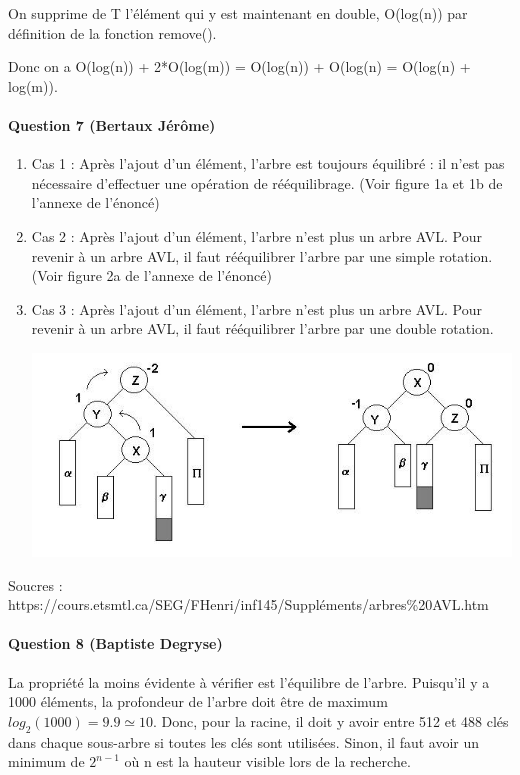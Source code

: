 \documentclass[a4paper]{article}
\begin{document}
On supprime de T l'élément qui y est maintenant en double, O(log(n)) par définition de la fonction remove().

Donc on a O(log(n)) + 2*O(log(m)) = O(log(n)) + O(log(n) = O(log(n) + log(m)). 

\paragraph*{Question 7 (Bertaux Jérôme)}
\begin{enumerate}
\item Cas 1 :  Après l'ajout d'un élément, l'arbre est toujours équilibré : il n'est pas nécessaire d'effectuer une opération de rééquilibrage. (Voir figure 1a et 1b de l'annexe de l'énoncé)
\item Cas 2 : Après l'ajout d'un élément, l'arbre n'est plus un arbre AVL. Pour revenir à un arbre AVL, il faut rééquilibrer l'arbre par une simple rotation. (Voir figure 2a de l'annexe de l'énoncé)
\item Cas 3 : Après l'ajout d'un élément, l'arbre n'est plus un arbre AVL. Pour revenir à un arbre AVL, il faut rééquilibrer l'arbre par une double rotation.
\begin{center}
\includegraphics[scale=0.5]{double_rotation}
\end{center}
\end{enumerate}
{\footnotesize Soucres : \\
https://cours.etsmtl.ca/SEG/FHenri/inf145/Suppléments/arbres\%20AVL.htm\\}

\paragraph*{Question 8 (Baptiste Degryse)}
La propriété la moins évidente à vérifier est l'équilibre de l'arbre. Puisqu'il y a 1000 éléments, la profondeur de l'arbre doit être de maximum $log_2(1000) = 9.9 \simeq 10 $. Donc, pour la racine, il doit y avoir entre 512 et 488 clés dans chaque sous-arbre si toutes les clés sont utilisées. Sinon, il faut avoir un minimum de $2^{n-1}$ où n est la hauteur visible lors de la recherche.
\end{document}
